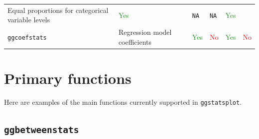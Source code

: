 \documentclass[]{article}
\begin{document}
\begin{longtable}[]{@{}llllll@{}}
\begin{minipage}[t]{0.35\columnwidth}
Equal proportions for categorical variable levels\strut
\end{minipage} & \begin{minipage}[t]{0.08\columnwidth}\raggedright
\textcolor{ForestGreen}{Yes}\strut
\end{minipage} & \begin{minipage}[t]{0.10\columnwidth}\raggedright
\texttt{NA}\strut
\end{minipage} & \begin{minipage}[t]{0.08\columnwidth}\raggedright
\texttt{NA}\strut
\end{minipage} & \begin{minipage}[t]{0.10\columnwidth}\raggedright
\textcolor{ForestGreen}{Yes}\strut
\end{minipage}\tabularnewline
\begin{minipage}[t]{0.14\columnwidth}\raggedright
\texttt{ggcoefstats}\strut
\end{minipage} & \begin{minipage}[t]{0.35\columnwidth}\raggedright
Regression model coefficients\strut
\end{minipage} & \begin{minipage}[t]{0.08\columnwidth}\raggedright
\textcolor{ForestGreen}{Yes}\strut
\end{minipage} & \begin{minipage}[t]{0.10\columnwidth}\raggedright
\textcolor{red}{No}\strut
\end{minipage} & \begin{minipage}[t]{0.08\columnwidth}\raggedright
\textcolor{ForestGreen}{Yes}\strut
\end{minipage} & \begin{minipage}[t]{0.10\columnwidth}\raggedright
\textcolor{red}{No}\strut
\end{minipage}\tabularnewline
\bottomrule
\end{longtable}

\hypertarget{primary-functions}{%
\section{Primary functions}\label{primary-functions}}

Here are examples of the main functions currently supported in
\texttt{ggstatsplot}.

\hypertarget{ggbetweenstats}{%
\subsection{\texorpdfstring{\texttt{ggbetweenstats}}{ggbetweenstats}}\label{ggbetweenstats}}
\end{document}
